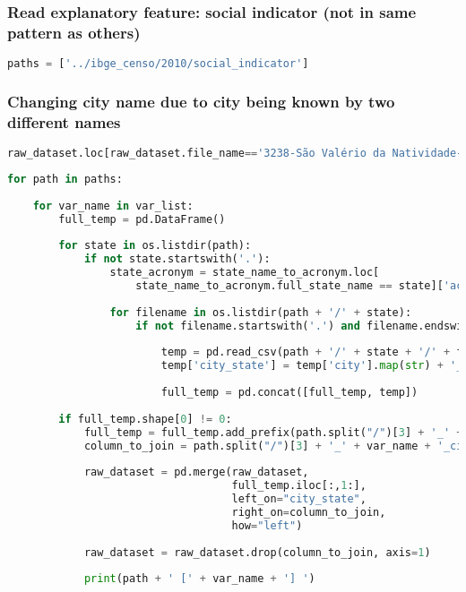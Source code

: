 \subsubsection{Read explanatory feature: social indicator (not in same
pattern as
others)}\label{read-explanatory-feature-social-indicator-not-in-same-pattern-as-others}

\begin{lstlisting}[language=Python]
paths = ['../ibge_censo/2010/social_indicator']
\end{lstlisting}

\subsubsection{Changing city name due to city being known by two
different
names}\label{changing-city-name-due-to-city-being-known-by-two-different-names}

\begin{lstlisting}[language=Python]
raw_dataset.loc[raw_dataset.file_name=='3238-São Valério da Natividade-TO.pdf', 'city_state'] = 'sao valerio_to'
\end{lstlisting}

\begin{lstlisting}[language=Python]
for path in paths:
    
    for var_name in var_list:
        full_temp = pd.DataFrame()
        
        for state in os.listdir(path):
            if not state.startswith('.'):
                state_acronym = state_name_to_acronym.loc[
                    state_name_to_acronym.full_state_name == state]['acronym'].values[0]
                
                for filename in os.listdir(path + '/' + state):
                    if not filename.startswith('.') and filename.endswith(var_name + '.csv'):
                        
                        temp = pd.read_csv(path + '/' + state + '/' + filename)
                        temp['city_state'] = temp['city'].map(str) + '_' + state_acronym
                        
                        full_temp = pd.concat([full_temp, temp])
                        
        if full_temp.shape[0] != 0:
            full_temp = full_temp.add_prefix(path.split("/")[3] + '_' + var_name + '_')
            column_to_join = path.split("/")[3] + '_' + var_name + '_city_state'
            
            raw_dataset = pd.merge(raw_dataset,
                                   full_temp.iloc[:,1:],
                                   left_on="city_state",
                                   right_on=column_to_join,
                                   how="left")
            
            raw_dataset = raw_dataset.drop(column_to_join, axis=1)
            
            print(path + ' [' + var_name + '] ')
        
\end{lstlisting}

